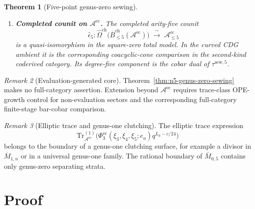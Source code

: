 \documentclass[11pt,reqno]{amsart}
\newtheorem{theorem}{Theorem}[section]
\theoremstyle{definition}
\theoremstyle{remark}
\newtheorem{remark}[theorem]{Remark}
\newcommand{\cA}{\mathcal{A}}
\newcommand{\barB}{\overline{B}}
\newcommand{\Tr}{\mathrm{Tr}}
\begin{document}
\begin{theorem}[Five-point genus-zero sewing]
\begin{enumerate}[label=(\roman*)]
\item \textbf{Completed counit on $\cA^{\mathrm{ec}}$.} The completed
arity-five counit
\[
\widehat\epsilon_5\colon
\widehat\Omega^{\mathrm{ch}}\bigl(\barB^{\mathrm{ch}}_{\le 5}
(\cA^{\mathrm{ec}})\bigr)
\;\xrightarrow{\;\sim\;}\;
\cA^{\mathrm{ec}}_{\le 5}
\]
is a quasi-isomorphism in the square-zero total model. In the
curved CDG ambient it is the corresponding coacyclic-cone
comparison in the second-kind coderived category. Its degree-five
component is the cobar dual of $\tau^{\mathrm{sew},5}$.
\end{enumerate}
\end{theorem}

\begin{remark}[Evaluation-generated core]
\label{rem:n5-evaluation-core}
Theorem~\ref{thm:n5-genus-zero-sewing} makes no full-category
assertion. Extension beyond $\cA^{\mathrm{ec}}$ requires trace-class
OPE-growth control for non-evaluation sectors and the corresponding
full-category finite-stage bar-cobar comparison.
\end{remark}

\begin{remark}[Elliptic trace and genus-one clutching]
\label{rem:n5-elliptic-trace-separate}
The elliptic trace expression
\[
\Tr_{\cA^{\mathrm{ec}}}^{(1)}
\bigl(\Phi^{\mathrm{ec}}_3(\xi_3,\xi_4,\xi_5;e_a)
q^{L_0-c/24}\bigr)
\]
belongs to the boundary of a genus-one clutching surface, for
example a divisor in \(\overline M_{1,n}\) or in a universal
genus-one family. The rational boundary of \(\bar M_{0,5}\)
contains only genus-zero separating strata.
\end{remark}

\section{Proof}
\label{sec:n5-proof}
\end{document}
